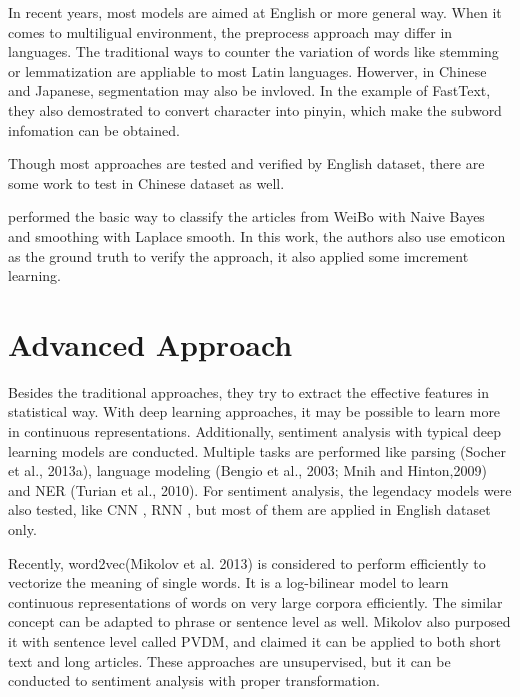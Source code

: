 In recent years, most models are aimed at English or more general way. When it comes to multiligual environment, the preprocess approach may differ in languages. The traditional ways to counter the variation of words like stemming or lemmatization are appliable to most Latin languages.
Howerver, in Chinese and Japanese, segmentation may also be invloved. In the example of FastText\cite{joulin2016fasttext}, they also demostrated to convert character into pinyin, which make the subword infomation can be obtained. 

Though most approaches are tested and verified by English dataset, there are some work to test in Chinese dataset as well.

\cite{zhao2012moodlens} performed the basic way to classify the articles from WeiBo with Naive Bayes and smoothing with Laplace smooth.  
In this work, the authors also use emoticon as the ground truth to verify the approach, it also applied some imcrement learning. \\


\section{Advanced Approach}

Besides the traditional approaches, they try to extract the effective features in statistical way. 
With deep learning approaches, it may be possible to learn more in continuous representations.
Additionally, sentiment analysis with typical deep learning models are conducted. Multiple tasks are performed like  parsing (Socher et al., 2013a), language
modeling (Bengio et al., 2003; Mnih and Hinton,2009) and NER (Turian et al., 2010). For sentiment analysis, the legendacy models were also tested, like CNN \cite{kim2014convolutional}, RNN \cite{arevian2007recurrent}, but most of them are applied in English dataset only. 

Recently, word2vec(Mikolov et al. 2013)\cite{word2vec} is considered to perform efficiently to vectorize the meaning of single words. It is a log-bilinear model to learn continuous
representations of words on very large corpora efficiently. The similar concept can be adapted to phrase or sentence level as well.
Mikolov also purposed it with sentence level \cite{PVDM} called PVDM, and claimed it can be applied to both short text and long articles. These approaches are unsupervised, but it can be conducted to sentiment analysis with proper transformation. 

